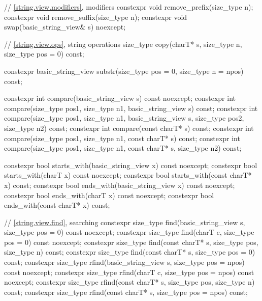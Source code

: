 \begin{codeblock}
{  // \ref{string.view.modifiers}, modifiers
  constexpr void remove_prefix(size_type n);
  constexpr void remove_suffix(size_type n);
  constexpr void swap(basic_string_view& s) noexcept;

  // \ref{string.view.ops}, string operations
  size_type copy(charT* s, size_type n, size_type pos = 0) const;

  constexpr basic_string_view substr(size_type pos = 0, size_type n = npos) const;

  constexpr int compare(basic_string_view s) const noexcept;
  constexpr int compare(size_type pos1, size_type n1, basic_string_view s) const;
  constexpr int compare(size_type pos1, size_type n1, basic_string_view s,
                        size_type pos2, size_type n2) const;
  constexpr int compare(const charT* s) const;
  constexpr int compare(size_type pos1, size_type n1, const charT* s) const;
  constexpr int compare(size_type pos1, size_type n1, const charT* s, size_type n2) const;

  constexpr bool starts_with(basic_string_view x) const noexcept;
  constexpr bool starts_with(charT x) const noexcept;
  constexpr bool starts_with(const charT* x) const;
  constexpr bool ends_with(basic_string_view x) const noexcept;
  constexpr bool ends_with(charT x) const noexcept;
  constexpr bool ends_with(const charT* x) const;

  // \ref{string.view.find}, searching
  constexpr size_type find(basic_string_view s, size_type pos = 0) const noexcept;
  constexpr size_type find(charT c, size_type pos = 0) const noexcept;
  constexpr size_type find(const charT* s, size_type pos, size_type n) const;
  constexpr size_type find(const charT* s, size_type pos = 0) const;
  constexpr size_type rfind(basic_string_view s, size_type pos = npos) const noexcept;
  constexpr size_type rfind(charT c, size_type pos = npos) const noexcept;
  constexpr size_type rfind(const charT* s, size_type pos, size_type n) const;
  constexpr size_type rfind(const charT* s, size_type pos = npos) const;

}
\end{codeblock}
